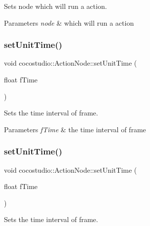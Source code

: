 Sets node which will run a action.


\begin{DoxyParams}{Parameters}
{\em node} & which will run a action \\
\hline
\end{DoxyParams}
\mbox{\label{classcocostudio_1_1ActionNode_acd7aacf5c0b22f3d9eee8a7504c8b852}} 
\subsubsection{\texorpdfstring{set\+Unit\+Time()}{setUnitTime()}\hspace{0.1cm}{\footnotesize\ttfamily [1/2]}}
{\footnotesize\ttfamily void cocostudio\+::\+Action\+Node\+::set\+Unit\+Time (\begin{DoxyParamCaption}\item[{float}]{f\+Time }\end{DoxyParamCaption})}

Sets the time interval of frame.


\begin{DoxyParams}{Parameters}
{\em f\+Time} & the time interval of frame \\
\hline
\end{DoxyParams}
\mbox{\label{classcocostudio_1_1ActionNode_acd7aacf5c0b22f3d9eee8a7504c8b852}} 
\subsubsection{\texorpdfstring{set\+Unit\+Time()}{setUnitTime()}\hspace{0.1cm}{\footnotesize\ttfamily [2/2]}}
{\footnotesize\ttfamily void cocostudio\+::\+Action\+Node\+::set\+Unit\+Time (\begin{DoxyParamCaption}\item[{float}]{f\+Time }\end{DoxyParamCaption})}

Sets the time interval of frame.


